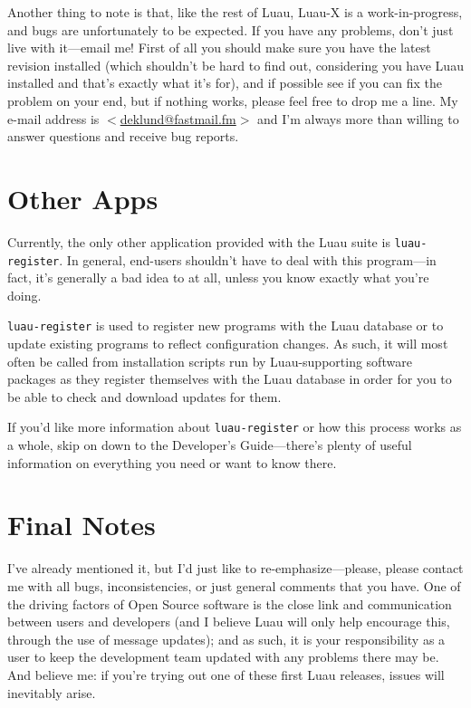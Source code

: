\documentclass{report}
\begin{document}
Another thing to note is that, like the rest of Luau, Luau-X is a work-in-progress, and bugs are unfortunately to be expected.  If you have any problems, don't just live with it---email me!  First of all you should make sure you have the latest revision installed (which shouldn't be hard to find out, considering you have Luau installed and that's exactly what it's for), and if possible see if you can fix the problem on your end, but if nothing works, please feel free to drop me a line.  My e-mail address is \href{mailto:deklund@fastmail.fm}{$<$deklund@fastmail.fm$>$} and I'm always more than willing to answer questions and receive bug reports.

\section{Other Apps}

Currently, the only other application provided with the Luau suite is \verb+luau-register+.  In general, end-users shouldn't have to deal with this program---in fact, it's generally a bad idea to at all, unless you know exactly what you're doing.

\verb+luau-register+ is used to register new programs with the Luau database or to update existing programs to reflect configuration changes.  As such, it will most often be called from installation scripts run by Luau-supporting software packages as they register themselves with the Luau database in order for you to be able to check and download updates for them.

If you'd like more information about \verb+luau-register+ or how this process works as a whole, skip on down to the Developer's Guide---there's plenty of useful information on everything you need or want to know there.

\section{Final Notes}

I've already mentioned it, but I'd just like to re-emphasize---please, please contact me with all bugs, inconsistencies, or just general comments that you have.  One of the driving factors of Open Source software is the close link and communication between users and developers (and I believe Luau will only help encourage this, through the use of message updates); and as such, it is your responsibility as a user to keep the development team updated with any problems there may be.  And believe me: if you're trying out one of these first Luau releases, issues will inevitably arise.
\end{document}
